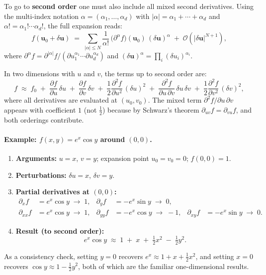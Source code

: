 To go to \textbf{second order} one must also include all mixed second
derivatives.  Using the multi-index notation
$\alpha = (\alpha_1,\ldots,\alpha_d)$ with
$|\alpha|=\alpha_1+\cdots+\alpha_d$ and
$\alpha! = \alpha_1!\cdots\alpha_d!$, the full expansion reads:
\begin{equation}
	f(\boldsymbol{u}_0 + \delta\boldsymbol{u})
	\;=\; \sum_{|\alpha|\leq N}
	\frac{1}{\alpha!}\,\bigl(\partial^{\alpha}f\bigr)(\boldsymbol{u}_0)
	\,(\delta\boldsymbol{u})^{\alpha}
	\;+\; \mathcal{O}\!\left(|\delta\boldsymbol{u}|^{N+1}\right),
	\label{eq:taylor_multiindex}
\end{equation}
where $\partial^{\alpha}f = \partial^{|\alpha|}f /
(\partial u_1^{\alpha_1}\cdots\partial u_d^{\alpha_d})$ and
$(\delta\boldsymbol{u})^{\alpha}=\prod_i(\delta u_i)^{\alpha_i}$.

In two dimensions with $u$ and $v$, the terms up to second order are:
\begin{equation}
	f \;\approx\; f_0
	\;+\; \frac{\partial f}{\partial u}\,\delta u
	\;+\; \frac{\partial f}{\partial v}\,\delta v
	\;+\; \frac{1}{2}\frac{\partial^2 f}{\partial u^2}\,(\delta u)^2
	\;+\; \frac{\partial^2 f}{\partial u\,\partial v}\,\delta u\,\delta v
	\;+\; \frac{1}{2}\frac{\partial^2 f}{\partial v^2}\,(\delta v)^2,
	\label{eq:taylor2d}
\end{equation}
where all derivatives are evaluated at $(u_0,v_0)$.  The mixed term
$\partial^2 f/\partial u\,\partial v$ appears with coefficient $1$ (not
$\tfrac{1}{2}$) because by Schwarz's theorem
$\partial_{uv}f = \partial_{vu}f$, and both orderings contribute.

\paragraph{Example: $f(x,y)=e^x\cos y$ around $(0,0)$.}

\begin{enumerate}
	\item \textbf{Arguments:} $u=x$, $v=y$; expansion point $u_0=v_0=0$;
	$f(0,0)=1$.
	\item \textbf{Perturbations:} $\delta u = x$, $\delta v = y$.
	\item \textbf{Partial derivatives at $(0,0)$:}
	\begin{align*}
		\partial_x f &= e^x\cos y \;\to\; 1, &
		\partial_y f &= -e^x\sin y \;\to\; 0,\\
		\partial_{xx}f &= e^x\cos y \;\to\; 1, &
		\partial_{yy}f &= -e^x\cos y \;\to\; -1, &
		\partial_{xy}f &= -e^x\sin y \;\to\; 0.
	\end{align*}
	\item \textbf{Result (to second order):}
	\begin{equation}
		e^x\cos y \;\approx\; 1 \;+\; x \;+\; \tfrac{1}{2}x^2
		\;-\; \tfrac{1}{2}y^2.
	\end{equation}
\end{enumerate}

\noindent As a consistency check, setting $y=0$ recovers $e^x\approx
1+x+\tfrac{1}{2}x^2$, and setting $x=0$ recovers $\cos y\approx
1-\tfrac{1}{2}y^2$, both of which are the familiar one-dimensional results.
